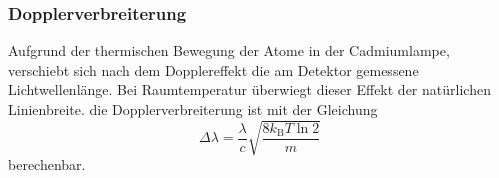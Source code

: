 \subsubsection{Dopplerverbreiterung}
Aufgrund der thermischen Bewegung der Atome in der Cadmiumlampe, verschiebt sich 
nach dem Dopplereffekt die am Detektor gemessene Lichtwellenlänge. Bei Raumtemperatur
überwiegt dieser Effekt der natürlichen Linienbreite. die Dopplerverbreiterung
ist mit der Gleichung 
\begin{equation*}
    \Delta\lambda = \frac{\lambda}{c}\sqrt{\frac{8k_\mathrm BT\ln 2}{m}}
\end{equation*}
berechenbar. 

